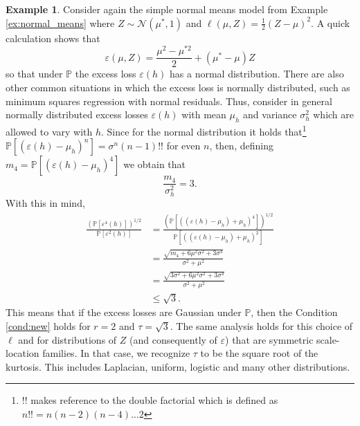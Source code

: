 \documentclass{uvamath}
\newcommand*{\calF}{\mathcal{F}}
\newcommand*{\calN}{\mathcal{N}}
\newcommand*{\calX}{\mathcal{X}}
\newcommand*{\calY}{\mathcal{Y}}
\newcommand*{\bbP}{\mathbb{P}}
\theoremstyle{remark}
\theoremstyle{definition}
\theoremstyle{definition}
\theoremstyle{definition}
\newtheorem{example}[theorem]{Example}
\theoremstyle{definition}
\theoremstyle{definition}
\begin{document}
\begin{example}\label{ex:new_cond_example}
  Consider again the simple normal means model from Example
  \ref{ex:normal_means} where $Z\sim \calN(\mu^*, 1)$ and
  $\ell(\mu,Z) =\frac{1}{2}(Z-\mu)^2$. A quick calculation shows that
  \begin{equation*}
    \varepsilon(\mu,Z) = \frac{\mu^2 - \mu^{*2} }{2} + (\mu^*-\mu)Z
  \end{equation*}
  so that under $\bbP$ the excess loss $\varepsilon(h)$ has a normal
  distribution. There are also other common situations in which the
  excess loss is normally distributed, such as minimum squares
  regression with normal residuals. Thus, consider in general normally
  distributed excess losses $\varepsilon(h)$ with mean $\mu_h$ and
  variance $\sigma^2_h$ which are allowed to vary with $h$. Since for
  the normal distribution it holds that\footnote{$!!$ makes reference
    to the double factorial which is defined as
    $ n!! = n(n-2)(n-4)\dots 2$}
  $\bbP[(\varepsilon(h)-\mu_h)^n] = \sigma^n(n-1)!!$ for even $n$,
  then, defining $m_4 =\bbP[(\varepsilon(h)-\mu_h)^4]$ we obtain that
  \begin{equation*}
    \frac{m_4}{\sigma_h^2} = 3 .
  \end{equation*}
  With this in mind,
  \begin{align*}
    \frac{(\bbP[\varepsilon^4(h)])^{1/2}}{\bbP[\varepsilon^2(h)]}
    &=
      \frac{(\bbP[((\varepsilon(h) - \mu_h) +
      \mu_h)^4])^{1/2}}{\bbP[((\varepsilon(h) - \mu_h) + \mu_h)^2]} \\
    &=
      \frac{\sqrt{m_4 + 6\mu^2\sigma^2 + 3\sigma^4}}{ \sigma^2 + \mu^2}\\
    &=
      \frac{\sqrt{3\sigma^2 + 6\mu^2\sigma^2 + 3\sigma^4}}{\sigma^2 +
      \mu^2}\\
    &\leq \sqrt{3}.
\end{align*}
This means that if the excess losses are Gaussian under $\bbP$, then
the Condition \ref{cond:new} holds for $r=2$ and $\tau = \sqrt{3}$.
The same analysis holds for this choice of $\ell$ and for
distributions of $Z$ (and consequently of $\varepsilon$) that are
symmetric scale-location families. In that case, we recognize $\tau$
to be the square root of the kurtosis. This includes Laplacian,
uniform, logistic and many other distributions.
\end{example}
\end{document}
